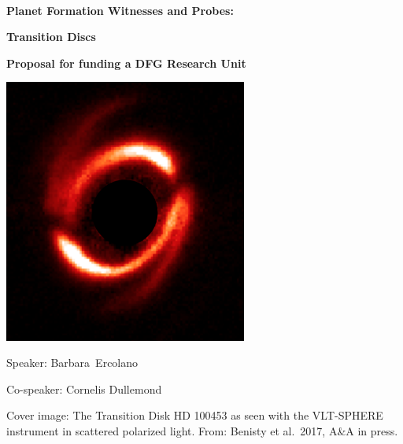 \documentclass[10pt,fleqn,twoside]{article}
\newcommand{\Titlecol}{\color{Black}}
\begin{document}
\pagestyle{empty}
\mbox{}
\vspace{1cm}\\

\centerline{\Titlecol\huge \bf Planet Formation Witnesses and Probes:}
\vspace{0.5cm}
\centerline{\Titlecol\huge \bf Transition Discs}
\vspace{2cm}
\centerline{\Titlecol\Large \bf Proposal for funding a DFG Research Unit}
\vspace{2cm}
\centerline{\includegraphics[width=0.6\textwidth]{HD100453.png}}
\vspace{1cm}
\centerline{\Large Speaker: Barbara~Ercolano}
\vspace{0.5cm}
\centerline{\Large Co-speaker: Cornelis Dullemond}


\pagebreak[4]

\mbox{}
\vfill
Cover image: The Transition Disk HD 100453 as seen with the VLT-SPHERE 
instrument in scattered polarized light. From: Benisty et al.~2017,
A\&A in press.


\pagebreak[4]
\end{document}
